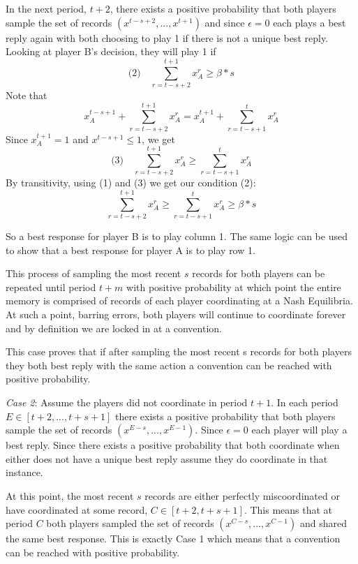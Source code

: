 \documentclass{article}
\begin{document}
In the next period, $t+2$, there exists a positive probability that both players sample the set of records $(x^{t-s+2},...,x^{t+1})$ and since $\epsilon=0$ each plays a best reply again with both choosing to play 1 if there is not a unique best reply. Looking at player B's decision, they will play 1 if
$$\text{(2)} \hspace{12pt} \sum\limits_{r=t-s+2}^{t+1} x^r_A \geq \beta*s$$
Note that
$$x^{t-s+1}_A+\sum\limits_{r=t-s+2}^{t+1} x^r_A = x^{t+1}_A+\sum\limits_{r=t-s+1}^t x^r_A$$
Since 
$x^{t+1}_A=1$ and $x^{t-s+1} \leq 1$, we get
$$\text{(3)} \hspace{12pt} \sum\limits_{r=t-s+2}^{t+1} x^r_A \geq \sum\limits_{r=t-s+1}^t x^r_A $$
By transitivity, using (1) and (3) we get our condition (2):
$$\sum\limits_{r=t-s+2}^{t+1} x^r_A \geq \sum\limits_{r=t-s+1}^t x^r_A \geq \beta*s$$

So a best response for player B is to play column 1. The same logic can be used to show that a best response for player A is to play row 1.

\vskip12pt

This process of sampling the most recent $s$ records for both players can be repeated until period $t+m$ with positive probability at which point the entire memory is comprised of records of each player coordinating at a Nash Equilibria. At such a point, barring errors, both players will continue to coordinate forever and by definition we are locked in at a convention.

This case proves that if after sampling the most recent s records for both players they both best reply with the same action a convention can be reached with positive probability.

\vskip12pt

\textit{Case 2}: Assume the players did not coordinate in period $t+1$. In each period $E \in [t+2,...,t+s+1]$ there exists a positive probability that both players sample the set of records $(x^{E-s},...,x^{E-1})$. Since $\epsilon=0$ each player will play a best reply. Since there exists a positive probability that both coordinate when either does not have a unique best reply assume they do coordinate in that instance.

At this point, the most recent $s$ records are either perfectly miscoordinated or have coordinated at some record, $C \in [t+2,t+s+1]$. This means that at period $C$ both players sampled the set of records $(x^{C-s},...,x^{C-1})$ and shared the same best response. This is exactly Case 1 which means that a convention can be reached with positive probability.
\end{document}
